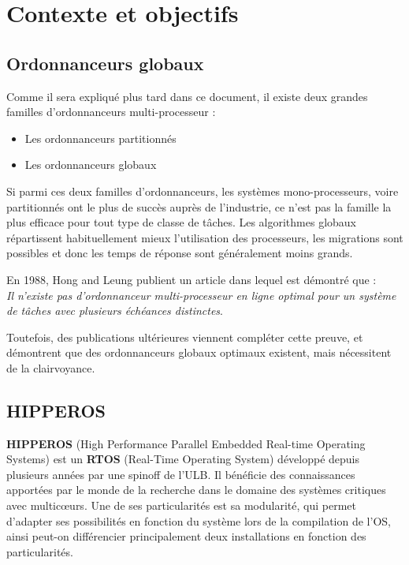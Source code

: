 \documentclass[11pt,a4paper,oneside]{report}
\newcommand{\customhighlight}[1]{{\textbf{#1}}}
\begin{document}
	\section{Contexte et objectifs}
	
	\subsection{Ordonnanceurs globaux}
	Comme il sera expliqué plus tard dans ce document, il existe deux grandes familles d'ordonnanceurs 
	multi-processeur :\medskip
	\begin{itemize}
		\item Les ordonnanceurs partitionnés
		\item Les ordonnanceurs globaux
	\end{itemize}
	Si parmi ces deux familles d'ordonnanceurs, les systèmes mono-processeurs, voire 
	partitionnés ont le plus de succès auprès de l'industrie, 
	ce n'est pas la famille la plus efficace pour tout type de classe de tâches. 
	Les algorithmes globaux répartissent habituellement mieux l'utilisation des processeurs, 
	les migrations sont possibles et donc les temps de réponse sont généralement moins grands.
	\medskip
	
	
	En 1988, Hong and Leung \cite{hong_-line_1988} publient un article dans lequel est 
	démontré que :\\
	\textit{\og Il n'existe pas d'ordonnanceur multi-processeur en ligne optimal pour un système de tâches 
		avec plusieurs échéances distinctes\fg{}}.
	
	Toutefois, des publications ultérieures viennent compléter cette preuve, et démontrent 
	que des ordonnanceurs globaux optimaux existent, mais nécessitent de la clairvoyance.
	
	\subsection{HIPPEROS}
	\customhighlight{HIPPEROS} (High Performance Parallel Embedded Real-time Operating Systems)
	est un \customhighlight{RTOS} (Real-Time Operating System) développé depuis plusieurs années par une spinoff de l'ULB.
	Il bénéficie des connaissances apportées par le monde de la recherche dans 
	le domaine des systèmes critiques avec multic\oe{}urs. Une de ses particularités 
	est sa modularité, qui permet d'adapter ses possibilités en fonction du système 
	lors de la compilation de l'OS, ainsi peut-on différencier principalement 
	deux installations en fonction des particularités.
	
\end{document}
